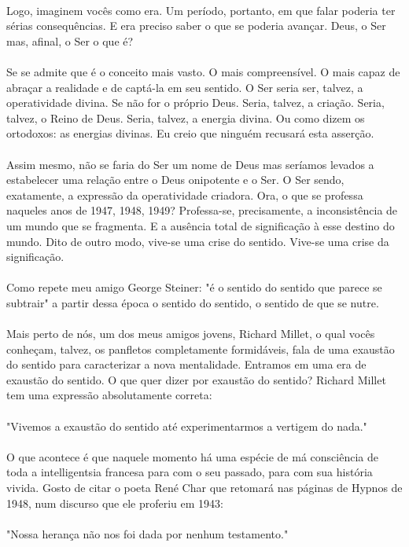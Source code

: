 \documentclass[10pt,a4paper]{book}
\begin{document}
	\\
	Logo, imaginem vocês como era. Um período, portanto, em que falar poderia ter sérias consequências. E era preciso saber o que se poderia avançar. Deus, o Ser mas, afinal, o Ser o que é?\\
	\\
	Se se admite que é o conceito mais vasto. O mais compreensível. O mais capaz de abraçar a realidade e de captá-la em seu sentido. O Ser seria ser, talvez, a operatividade divina. Se não for o próprio Deus. Seria, talvez, a criação. Seria, talvez, o Reino de Deus. Seria, talvez, a energia divina. Ou como dizem os ortodoxos: as energias divinas. Eu creio que ninguém recusará esta asserção.\\
	\\
	Assim mesmo, não se faria do Ser um nome de Deus mas seríamos levados a estabelecer uma relação entre o Deus onipotente e o Ser. O Ser sendo, exatamente, a expressão da operatividade criadora. Ora, o que se professa naqueles anos de 1947, 1948, 1949? Professa-se, precisamente, a inconsistência de um mundo que se fragmenta. E a ausência total de significação à esse destino do mundo. Dito de outro modo, vive-se uma crise do sentido. Vive-se uma crise da significação.\\
	\\
	Como repete meu amigo George Steiner: "é o sentido do sentido que parece se subtrair" a partir dessa época o sentido do sentido, o sentido de que se nutre.\\
	\\
	Mais perto de nós, um dos meus amigos jovens, Richard Millet, o qual vocês conheçam, talvez, os panfletos completamente formidáveis, fala de uma exaustão do sentido para caracterizar a nova  mentalidade. Entramos em uma era de exaustão do sentido. O que quer dizer por exaustão do sentido? Richard Millet tem uma expressão absolutamente correta:\\
	\\
	"Vivemos a exaustão do sentido até experimentarmos a vertigem do nada."\\
	\\
	O que acontece é que naquele momento há uma espécie de má consciência de toda a intelligentsia francesa para com o seu passado, para com sua história vivida. Gosto de citar o poeta René Char que retomará nas páginas de Hypnos de 1948, num discurso que ele proferiu em 1943:\\
	\\
	"Nossa herança não nos foi dada por nenhum testamento."\\
\end{document}

